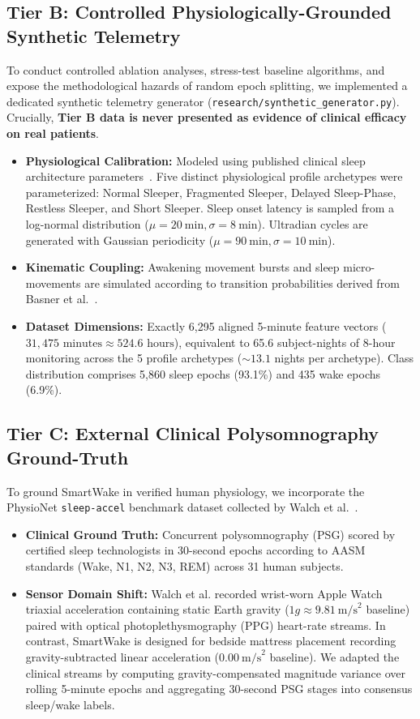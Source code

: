 \documentclass[journal,11pt,onecolumn]{IEEEtran}
\begin{document}
\subsection{Tier B: Controlled Physiologically-Grounded Synthetic Telemetry}
To conduct controlled ablation analyses, stress-test baseline algorithms, and expose the methodological hazards of random epoch splitting, we implemented a dedicated synthetic telemetry generator (\texttt{research/synthetic\_generator.py}). Crucially, \textbf{Tier B data is never presented as evidence of clinical efficacy on real patients}.
\begin{itemize}[leftmargin=*]
    \item \textbf{Physiological Calibration:} Modeled using published clinical sleep architecture parameters~\cite{carskadon2011normal, basner2008american}. Five distinct physiological profile archetypes were parameterized: Normal Sleeper, Fragmented Sleeper, Delayed Sleep-Phase, Restless Sleeper, and Short Sleeper. Sleep onset latency is sampled from a log-normal distribution ($\mu = 20~\text{min}, \sigma = 8~\text{min}$). Ultradian cycles are generated with Gaussian periodicity ($\mu = 90~\text{min}, \sigma = 10~\text{min}$).
    \item \textbf{Kinematic Coupling:} Awakening movement bursts and sleep micro-movements are simulated according to transition probabilities derived from Basner et al.~\cite{basner2008american}.
    \item \textbf{Dataset Dimensions:} Exactly 6,295 aligned 5-minute feature vectors ($31,475\text{ minutes} \approx 524.6\text{ hours}$), equivalent to 65.6 subject-nights of 8-hour monitoring across the 5 profile archetypes ($\sim 13.1$ nights per archetype). Class distribution comprises 5,860 sleep epochs (93.1\%) and 435 wake epochs (6.9\%).
\end{itemize}

\subsection{Tier C: External Clinical Polysomnography Ground-Truth}
To ground SmartWake in verified human physiology, we incorporate the PhysioNet \texttt{sleep-accel} benchmark dataset collected by Walch et al.~\cite{walch2019sleep}.
\begin{itemize}[leftmargin=*]
    \item \textbf{Clinical Ground Truth:} Concurrent polysomnography (PSG) scored by certified sleep technologists in 30-second epochs according to AASM standards (Wake, N1, N2, N3, REM) across 31 human subjects.
    \item \textbf{Sensor Domain Shift:} Walch et al. recorded wrist-worn Apple Watch triaxial acceleration containing static Earth gravity ($1g \approx 9.81~\text{m/s}^2$ baseline) paired with optical photoplethysmography (PPG) heart-rate streams. In contrast, SmartWake is designed for bedside mattress placement recording gravity-subtracted linear acceleration ($0.00~\text{m/s}^2$ baseline). We adapted the clinical streams by computing gravity-compensated magnitude variance over rolling 5-minute epochs and aggregating 30-second PSG stages into consensus sleep/wake labels.
\end{itemize}
\end{document}
